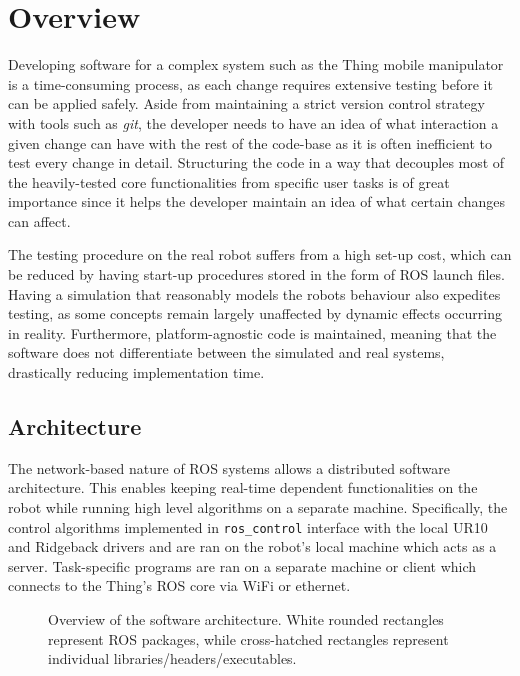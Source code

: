 \documentclass[times, utf8, diplomski, english]{fer}
\begin{document}
\section{Overview}\label{section:overview}
Developing software for a complex system such as the Thing mobile manipulator is a time-consuming process, as each change requires extensive testing before it can be applied safely.
Aside from maintaining a strict version control strategy with tools such as \textit{git}, the developer needs to have an idea of what interaction a given change can have with the rest of the code-base as it is often inefficient to test every change in detail.
Structuring the code in a way that decouples most of the heavily-tested core functionalities from specific user tasks is of great importance since it helps the developer maintain an idea of what certain changes can affect.

The testing procedure on the real robot suffers from a high set-up cost, which can be reduced by having start-up procedures stored in the form of ROS launch files.
Having a simulation that reasonably models the robots behaviour also expedites testing, as some concepts remain largely unaffected by dynamic effects occurring in reality.
Furthermore, platform-agnostic code is maintained, meaning that the software does not differentiate between the simulated and real systems, drastically reducing implementation time.
\subsection{Architecture}
The network-based nature of ROS systems allows a distributed software architecture.
This enables keeping real-time dependent functionalities on the robot while running high level algorithms on a separate machine.
Specifically, the control algorithms implemented in \verb|ros_control| interface with the local UR10 and Ridgeback drivers and are ran on the robot's local machine which acts as a server.
Task-specific programs are ran on a separate machine or client which connects to the Thing's ROS core via WiFi or ethernet.
\begin{figure}

\caption{Overview of the software architecture. White rounded rectangles represent ROS packages, while cross-hatched rectangles represent individual libraries/headers/executables.}
\label{fig:overview}
\end{figure} 
\end{document}
